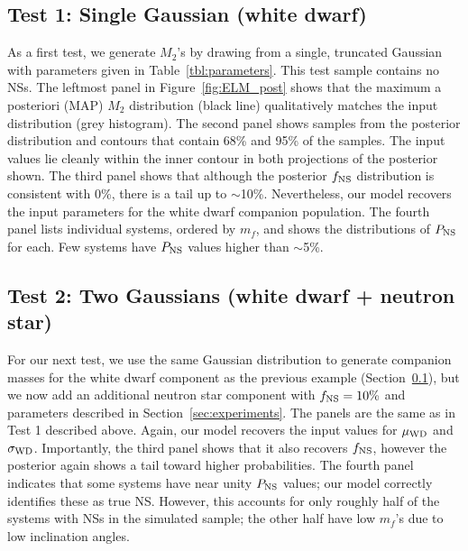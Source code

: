 \documentclass[apjl]{emulateapj}
\newcommand{\mf}{m_f}
\begin{document}
\subsection{Test 1: Single Gaussian (white dwarf)} \label{sec:exp1}

As a first test, we generate $M_2$'s by drawing from a single, truncated Gaussian with parameters given in Table~\ref{tbl:parameters}. This test sample contains no NSs. The leftmost panel in Figure~\ref{fig:ELM_post} shows that the maximum a posteriori (MAP) $M_2$ distribution (black line) qualitatively matches the input distribution (grey histogram). The second panel shows samples from the posterior distribution and contours that contain 68\% and 95\% of the samples. The input values lie cleanly within the inner contour in both projections of the posterior shown. The third panel shows that although the posterior $f_{\rm NS}$ distribution is consistent with 0\%, there is a tail up to $\sim$10\%. Nevertheless, our model recovers the input parameters for the white dwarf companion population. The fourth panel lists individual systems, ordered by $\mf$, and shows the distributions of $P_{\rm NS}$ for each. Few systems have $P_{\rm NS}$ values higher than $\sim$5\%.



\subsection{Test 2: Two Gaussians (white dwarf + neutron star)} \label{sec:exp2}
For our next test, we use the same Gaussian distribution to generate companion masses for the white dwarf component as the previous example (Section~\ref{sec:exp1}), but we now add an additional neutron star component with $f_{\rm NS} = 10\%$ and parameters described in Section~\ref{sec:experiments}. The panels are the same as in Test 1 described above. Again, our model recovers the input values for $\mu_{\rm WD}$ and $\sigma_{\rm WD}$. Importantly, the third panel shows that it also recovers $f_{\rm NS}$, however the posterior again shows a tail toward higher probabilities. The fourth panel indicates that some systems have near unity $P_{\rm NS}$ values; our model correctly identifies these as true NS. However, this accounts for only roughly half of the systems with NSs in the simulated sample; the other half have low $\mf$'s due to low inclination angles. 
\end{document}

